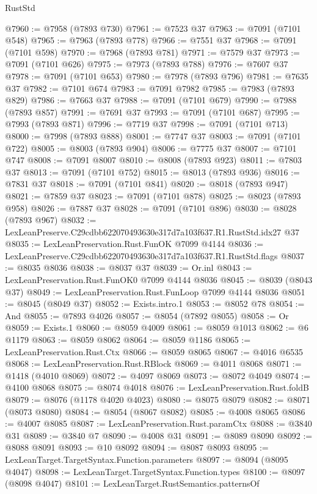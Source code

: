 \begin{lexlean}{RustStd}
\begin{coremodule}
@7960 := @7958 (@7893 @730)
@7961 := @7523 @37
@7963 := @7091 (@7101 @548)
@7965 := @7963 (@7893 @778)
@7966 := @7551 @37
@7968 := @7091 (@7101 @598)
@7970 := @7968 (@7893 @781)
@7971 := @7579 @37
@7973 := @7091 (@7101 @626)
@7975 := @7973 (@7893 @788)
@7976 := @7607 @37
@7978 := @7091 (@7101 @653)
@7980 := @7978 (@7893 @796)
@7981 := @7635 @37
@7982 := @7101 @674
@7983 := @7091 @7982
@7985 := @7983 (@7893 @829)
@7986 := @7663 @37
@7988 := @7091 (@7101 @679)
@7990 := @7988 (@7893 @857)
@7991 := @7691 @37
@7993 := @7091 (@7101 @687)
@7995 := @7993 (@7893 @871)
@7996 := @7719 @37
@7998 := @7091 (@7101 @713)
@8000 := @7998 (@7893 @888)
@8001 := @7747 @37
@8003 := @7091 (@7101 @722)
@8005 := @8003 (@7893 @904)
@8006 := @7775 @37
@8007 := @7101 @747
@8008 := @7091 @8007
@8010 := @8008 (@7893 @923)
@8011 := @7803 @37
@8013 := @7091 (@7101 @752)
@8015 := @8013 (@7893 @936)
@8016 := @7831 @37
@8018 := @7091 (@7101 @841)
@8020 := @8018 (@7893 @947)
@8021 := @7859 @37
@8023 := @7091 (@7101 @878)
@8025 := @8023 (@7893 @958)
@8026 := @7887 @37
@8028 := @7091 (@7101 @896)
@8030 := @8028 (@7893 @967)
@8032 := LexLeanPreserve.C29cdbb622070493630e317d7a103f637.R1.RustStd.idx27 @37
@8035 := LexLeanPreservation.Rust.FunOK @7099 @4144
@8036 := LexLeanPreserve.C29cdbb622070493630e317d7a103f637.R1.RustStd.flags
@8037 := @8035 @8036
@8038 := @8037 @37
@8039 := Or.inl
@8043 := LexLeanPreservation.Rust.FunOK0 @7099 @4144 @8036
@8045 := @8039 (@8043 @37)
@8049 := LexLeanPreservation.Rust.FunLoop @7099 @4144 @8036
@8051 := @8045 (@8049 @37)
@8052 := Exists.intro.{1}
@8053 := @8052 @78
@8054 := And
@8055 := @7893 @4026
@8057 := @8054 (@7892 @8055)
@8058 := Or
@8059 := Exists.{1}
@8060 := @8059 @4009
@8061 := @8059 @1013
@8062 := @6 @1179
@8063 := @8059 @8062
@8064 := @8059 @1186
@8065 := LexLeanPreservation.Rust.Ctx
@8066 := @8059 @8065
@8067 := @4016 @6535
@8068 := LexLeanPreservation.Rust.RBlock
@8069 := @4011 @8068
@8071 := @1418 (@4010 @8069)
@8072 := @4097 @8069
@8073 := @8072 @4049
@8074 := @4100 @8068
@8075 := @8074 @4018
@8076 := LexLeanPreservation.Rust.foldB
@8079 := @8076 (@1178 @4020 @4023)
@8080 := @8075 @8079
@8082 := @8071 (@8073 @8080)
@8084 := @8054 (@8067 @8082)
@8085 := @4008 @8065
@8086 := @4007 @8085
@8087 := LexLeanPreservation.Rust.paramCtx
@8088 := @3840 @31
@8089 := @3840 @7
@8090 := @4008 @31
@8091 := @8089 @8090
@8092 := @8088 @8091
@8093 := @10 @8092
@8094 := @8087 @8093
@8095 := LexLeanTarget.TargetSyntax.Function.parameters
@8097 := @8094 (@8095 @4047)
@8098 := LexLeanTarget.TargetSyntax.Function.types
@8100 := @8097 (@8098 @4047)
@8101 := LexLeanTarget.RustSemantics.patternsOf

\end{coremodule}
\end{lexlean}
